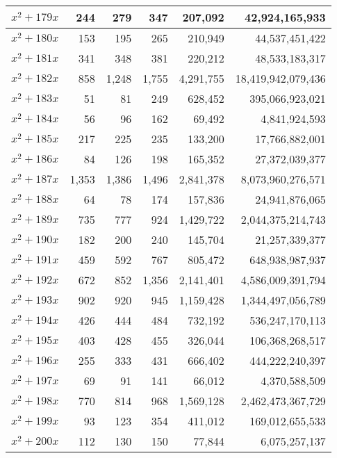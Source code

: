 \documentclass[a4paper]{amsproc}
\theoremstyle{plain}
\theoremstyle{named}
\begin{document}
\begin{longtable}{ | l | r | r | r | r | r | }
$x^2 + 179x$ & 244 & 279 & 347 & 207{,}092 & 42{,}924{,}165{,}933 \\ \hline
$x^2 + 180x$ & 153 & 195 & 265 & 210{,}949 & 44{,}537{,}451{,}422 \\ \hline
$x^2 + 181x$ & 341 & 348 & 381 & 220{,}212 & 48{,}533{,}183{,}317 \\ \hline
$x^2 + 182x$ & 858 & 1{,}248 & 1{,}755 & 4{,}291{,}755 & 18{,}419{,}942{,}079{,}436 \\ \hline
$x^2 + 183x$ & 51 & 81 & 249 & 628{,}452 & 395{,}066{,}923{,}021 \\ \hline
$x^2 + 184x$ & 56 & 96 & 162 & 69{,}492 & 4{,}841{,}924{,}593 \\ \hline
$x^2 + 185x$ & 217 & 225 & 235 & 133{,}200 & 17{,}766{,}882{,}001 \\ \hline
$x^2 + 186x$ & 84 & 126 & 198 & 165{,}352 & 27{,}372{,}039{,}377 \\ \hline
$x^2 + 187x$ & 1{,}353 & 1{,}386 & 1{,}496 & 2{,}841{,}378 & 8{,}073{,}960{,}276{,}571 \\ \hline
$x^2 + 188x$ & 64 & 78 & 174 & 157{,}836 & 24{,}941{,}876{,}065 \\ \hline
$x^2 + 189x$ & 735 & 777 & 924 & 1{,}429{,}722 & 2{,}044{,}375{,}214{,}743 \\ \hline
$x^2 + 190x$ & 182 & 200 & 240 & 145{,}704 & 21{,}257{,}339{,}377 \\ \hline
$x^2 + 191x$ & 459 & 592 & 767 & 805{,}472 & 648{,}938{,}987{,}937 \\ \hline
$x^2 + 192x$ & 672 & 852 & 1{,}356 & 2{,}141{,}401 & 4{,}586{,}009{,}391{,}794 \\ \hline
$x^2 + 193x$ & 902 & 920 & 945 & 1{,}159{,}428 & 1{,}344{,}497{,}056{,}789 \\ \hline
$x^2 + 194x$ & 426 & 444 & 484 & 732{,}192 & 536{,}247{,}170{,}113 \\ \hline
$x^2 + 195x$ & 403 & 428 & 455 & 326{,}044 & 106{,}368{,}268{,}517 \\ \hline
$x^2 + 196x$ & 255 & 333 & 431 & 666{,}402 & 444{,}222{,}240{,}397 \\ \hline
$x^2 + 197x$ & 69 & 91 & 141 & 66{,}012 & 4{,}370{,}588{,}509 \\ \hline
$x^2 + 198x$ & 770 & 814 & 968 & 1{,}569{,}128 & 2{,}462{,}473{,}367{,}729 \\ \hline
$x^2 + 199x$ & 93 & 123 & 354 & 411{,}012 & 169{,}012{,}655{,}533 \\ \hline
$x^2 + 200x$ & 112 & 130 & 150 & 77{,}844 & 6{,}075{,}257{,}137 \\ \hline

\end{longtable}
\end{document}
